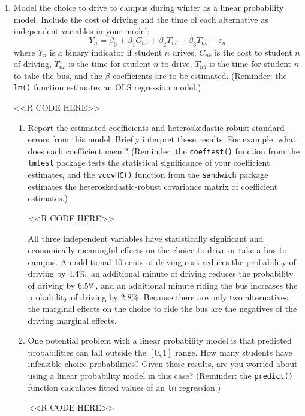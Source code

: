 \documentclass[11pt,letterpaper]{article}
\begin{document}
\begin{enumerate}[label=\alph*., leftmargin=*]
	\item Model the choice to drive to campus during winter as a linear probability model. Include the cost of driving and the time of each alternative as independent variables in your model:
	$$Y_n = \beta_0 + \beta_1 C_{nc} + \beta_2 T_{nc} + \beta_3 T_{nb} + \varepsilon_{n}$$
	where $Y_n$ is a binary indicator if student $n$ drives, $C_{nc}$ is the cost to student $n$ of driving, $T_{nc}$ is the time for student $n$ to drive, $T_{nb}$ is the time for student $n$ to take the bus, and the $\beta$ coefficients are to be estimated. (Reminder: the \texttt{lm()} function estimates an OLS regression model.)

	<<R CODE HERE>>

	\begin{enumerate}[label=\roman*.]
		\item Report the estimated coefficients and heteroskedastic-robust standard errors from this model. Briefly interpret these results. For example, what does each coefficient mean? (Reminder: the \texttt{coeftest()} function from the \texttt{lmtest} package tests the statistical significance of your coefficient estimates, and the \texttt{vcovHC()} function from the \texttt{sandwich} package estimates the heteroskedastic-robust covariance matrix of coefficient estimates.)

		<<R CODE HERE>>

		All three independent variables have statistically significant and economically meaningful effects on the choice to drive or take a bus to campus. An additional 10 cents of driving cost reduces the probability of driving by 4.4\%, an additional minute of driving reduces the probability of driving by 6.5\%, and an additional minute riding the bus increases the probability of driving by 2.8\%. Because there are only two alternatives, the marginal effects on the choice to ride the bus are the negatives of the driving marginal effects.

		\item One potential problem with a linear probability model is that predicted probabilities can fall outside the $[0, 1]$ range. How many students have infeasible choice probabilities? Given these results, are you worried about using a linear probability model in this case? (Reminder: the \texttt{predict()} function calculates fitted values of an \texttt{lm} regression.)

		<<R CODE HERE>>


\end{enumerate}
\end{enumerate}
\end{document}
